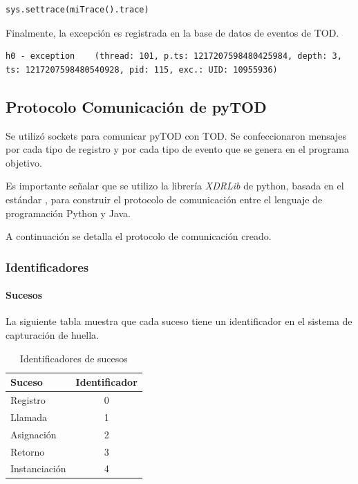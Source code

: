 \documentclass[12pt,legalpaper]{report}
\begin{document}
\begin{itemize}
\begin{singlespace}
\begin{lstlisting}[style=Python]
sys.settrace(miTrace().trace)
\end{lstlisting}
\end{singlespace}	
\end{itemize}		

Finalmente, la excepción es registrada en la base de datos de eventos de TOD.

\begin{singlespace}
\begin{lstlisting}[style=consola,numbers=none]
h0 - exception    (thread: 101, p.ts: 1217207598480425984, depth: 3, ts: 1217207598480540928, pid: 115, exc.: UID: 10955936)
\end{lstlisting}
\end{singlespace}	

		\subsection{Protocolo Comunicación de pyTOD}

Se utilizó sockets para comunicar pyTOD con TOD.  Se confeccionaron mensajes por cada tipo de registro y por cada tipo de evento que se genera en el programa objetivo.

Es importante señalar que se utilizo la librería \textit{XDRLib} \cite{xdrlib} de python, basada en el estándar \cite{xdrlibestandar}, para construir el protocolo de comunicación entre el lenguaje de programación Python y Java.

A continuación se detalla el protocolo de comunicación creado.

			\subsubsection{Identificadores}

				\paragraph{Sucesos}

La siguiente tabla muestra que cada suceso tiene un identificador en el sistema de capturación de huella.
\begin{table}[!h]
\begin{center}
\begin{tabular}{|l | c |}
\hline
\rowcolor[gray]{0.9}Suceso & Identificador\\
\hline
Registro & 0\\
\hline
Llamada & 1\\
\hline
Asignación & 2\\
\hline
Retorno & 3\\
\hline
Instanciación & 4\\
\hline
\end{tabular}
\caption{Identificadores de sucesos} 
\end{center}
\end{table}
\end{document}
